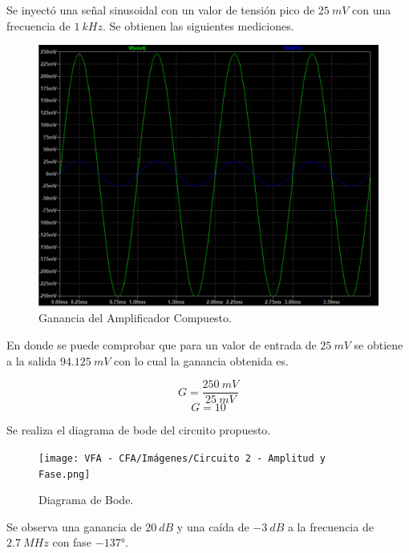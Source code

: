 \hspace{1mm} Se inyectó una señal sinusoidal con un valor de tensión pico de \(25~mV\) con una frecuencia de \( 1~kHz \).  Se obtienen las siguientes mediciones.
\begin{figure}[!h]
    \centering
    \includegraphics[width=0.6\linewidth]{VFA - CFA/Imágenes/Circuito 2 - Simulación.png}
    \caption{Ganancia del Amplificador Compuesto.}
\end{figure}
\hspace{1mm} En donde se puede comprobar que para un valor de entrada de \( 25~mV \) se obtiene a la salida \( 94.125~mV \) con lo cual la ganancia obtenida es.

\begin{equation}
    G = \frac{250~mV}{25~mV}
\end{equation}
\begin{equation}
    \boxed{
    G = 10
    }
\end{equation}

\hspace{1mm} Se realiza el diagrama de bode del circuito propuesto. 
\begin{figure}[!h]
    \centering
    \texttt{[image: VFA - CFA/Imágenes/Circuito 2 - Amplitud y Fase.png]}
    \caption{Diagrama de Bode.}
\end{figure}
\hspace{1mm} Se observa una ganancia de \(20~dB\) y una caída de \(-3~dB\) a la frecuencia de \(2.7~MHz\) con fase \(-137°\).






